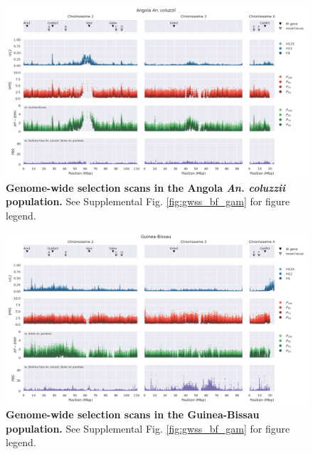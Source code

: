 \documentclass[a4paper,11pt,abstracton,hidelinks]{scrartcl}
\begin{document}
\begin{landscape}
\begin{figure}[t!]
	\begin{center}
		\includegraphics*[width=1\linewidth,center]{artwork/gwss_ao_col_gw_bf_col_gq_gam.png}
	\end{center}
	\caption{
	\textbf{Genome-wide selection scans in the Angola \textit{An. coluzzii} population.} 
	See Supplemental Fig. \ref{fig:gwss_bf_gam} for figure legend.
	} 
	\label{fig:gwss_ao_col}
\end{figure}


\begin{figure}[t!]
	\begin{center}
		\includegraphics*[width=1\linewidth,center]{artwork/gwss_gw_gq_gam_bf_col_gq_gam.png}
	\end{center}
	\caption{
	\textbf{Genome-wide selection scans in the Guinea-Bissau population.} 
	See Supplemental Fig. \ref{fig:gwss_bf_gam} for figure legend.
	} 
	\label{fig:gwss_gw}
\end{figure}




\end{landscape}
\end{document}
